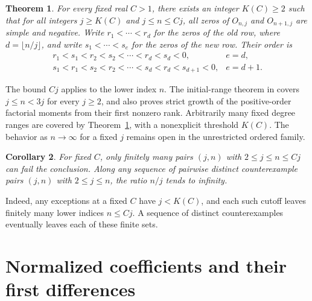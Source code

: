 \documentclass[11pt]{article}
\newtheorem{theorem}{Theorem}
\newtheorem{corollary}[theorem]{Corollary}
\begin{document}
\begin{theorem}\label{thm:main}
For every fixed real \(C>1\), there exists an integer \(K(C)\ge2\) such that for all integers \(j\ge K(C)\) and \(j\le n\le Cj\), all zeros of \(O_{n,j}\) and \(O_{n+1,j}\) are simple and negative. Write \(r_1<\cdots<r_d\) for the zeros of the old row, where \(d=\lfloor n/j\rfloor\), and write \(s_1<\cdots<s_e\) for the zeros of the new row. Their order is
\[
\begin{array}{ll}
 r_1<s_1<r_2<s_2<\cdots<r_d<s_d<0,& e=d,\\[2pt]
 s_1<r_1<s_2<r_2<\cdots<s_d<r_d<s_{d+1}<0,& e=d+1 .
\end{array}
\]
\end{theorem}

The bound \(Cj\) applies to the lower index \(n\). The initial-range theorem in \cite{initial} covers \(j\le n<3j\) for every \(j\ge2\), and also proves strict growth of the positive-order factorial moments from their first nonzero rank. Arbitrarily many fixed degree ranges are covered by Theorem~\ref{thm:main}, with a nonexplicit threshold \(K(C)\). The behavior as \(n\to\infty\) for a fixed \(j\) remains open in the unrestricted ordered family.

\begin{corollary}\label{cor:exception}
For fixed \(C\), only finitely many pairs \((j,n)\) with \(2\le j\le n\le Cj\) can fail the conclusion. Along any sequence of pairwise distinct counterexample pairs \((j,n)\) with \(2\le j\le n\), the ratio \(n/j\) tends to infinity.
\end{corollary}

Indeed, any exceptions at a fixed \(C\) have \(j<K(C)\), and each such cutoff leaves finitely many lower indices \(n\le Cj\). A sequence of distinct counterexamples eventually leaves each of these finite sets.

\section{Normalized coefficients and their first differences}
\end{document}
